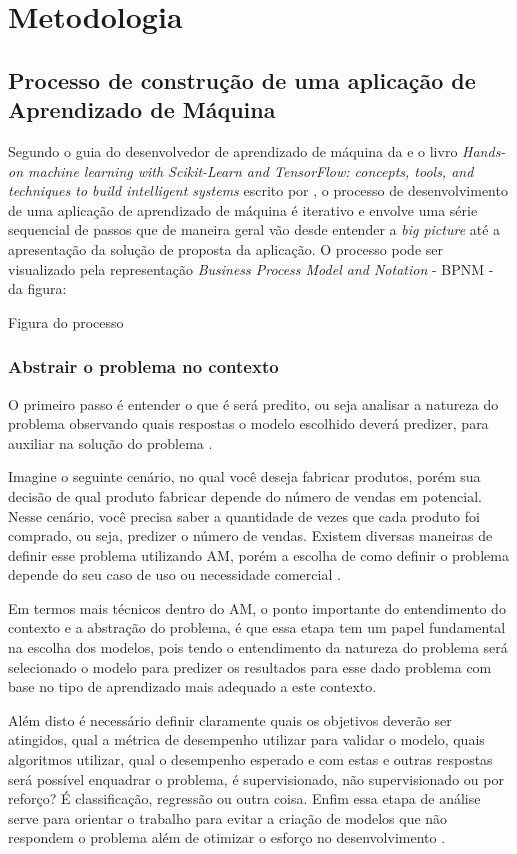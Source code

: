 \chapter{Metodologia}
\section{Processo de construção de uma aplicação de Aprendizado de Máquina}

Segundo o guia do desenvolvedor de aprendizado de máquina da \cite{Amazon} e o livro \textit{Hands-on machine learning with Scikit-Learn and TensorFlow: concepts, tools, and techniques to build intelligent systems} escrito por \cite{geron2017hands}, o processo de desenvolvimento de uma aplicação de aprendizado de máquina é iterativo e envolve uma série sequencial de passos que de maneira geral vão desde entender a \textit{big picture} até a apresentação da solução de proposta da aplicação. O processo pode ser visualizado pela representação \textit{Business Process Model and Notation} - BPNM - da figura:

Figura do processo 

\subsection{Abstrair o problema no contexto}
O primeiro passo é entender o que é será predito, ou seja analisar a natureza do problema observando quais respostas o modelo escolhido deverá predizer, para auxiliar na solução do problema \cite{geron2017hands}.

Imagine o seguinte cenário, no qual você deseja fabricar produtos, porém sua decisão de qual produto fabricar depende do número de vendas em potencial. Nesse cenário, você precisa saber a quantidade de vezes que cada produto foi comprado, ou seja, predizer o número de vendas. Existem diversas maneiras de definir esse problema utilizando AM, porém a escolha de como definir o problema depende do seu caso de uso ou necessidade comercial \cite{Amazon}.

Em termos mais técnicos dentro do AM, o ponto importante do entendimento do contexto e a abstração do problema, é que essa etapa tem um papel fundamental na escolha dos modelos, pois tendo o entendimento da natureza do problema será selecionado o modelo para predizer os resultados para esse dado problema com base no tipo de aprendizado mais adequado a este contexto.

Além disto é necessário definir claramente quais os objetivos deverão ser atingidos, qual a métrica de desempenho utilizar para validar o modelo, quais algoritmos utilizar, qual o desempenho esperado e com estas e outras respostas será possível enquadrar o problema, é supervisionado, não supervisionado ou por reforço? É classificação, regressão ou outra coisa\cite{geron2017hands}. Enfim essa etapa de análise serve para orientar o trabalho para evitar a criação de modelos que não respondem o problema além de otimizar o esforço no desenvolvimento \cite{Amazon}.

